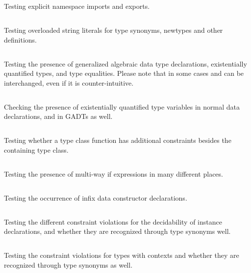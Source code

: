\documentclass[main.tex]{subfiles}
\begin{document}
	Testing explicit namespace imports and exports.
	
	\subsection{}
	
	Testing overloaded string literals for type synonyms, newtypes and other definitions.
	
	\subsection{}
	
	Testing the presence of generalized algebraic data type declarations, existentially quantified types, and type equalities. Please note that in some cases  and  can be interchanged, even if it is counter-intuitive.
	
	\subsection{}
	
	Checking the presence of existentially quantified type variables in normal data declarations, and in GADTs as well.
	
	\subsection{}
	
	Testing whether a type class function has additional constraints besides the containing type class.
	
	\subsection{}
	
	Testing the presence of multi-way if expressions in many different places.
	
	\subsection{}
	
	Testing the occurrence of infix data constructor declarations.
	
	\subsection{}
	
	Testing the different constraint violations for the decidability of instance declarations, and whether they are recognized through type synonyms well.
	
	\subsection{}
	
	Testing the constraint violations for types with contexts and whether they are recognized through type synonyms as well.
	
\end{document}
